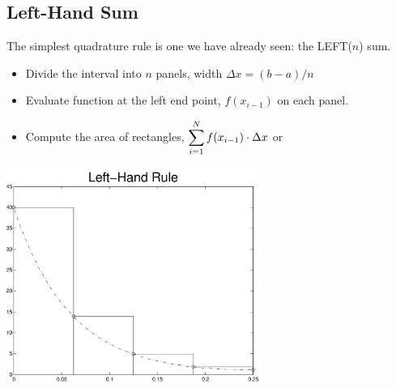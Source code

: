 \subsection*{Left-Hand Sum}
The simplest quadrature rule is one we have already seen: the LEFT($n$) sum.
\begin{itemize}
\item Divide the interval into $n$ panels, width $\Delta x = (b-a) / n$
\item Evaluate function at the left end point,
  $f(x_{i-1})$ on each panel. 
\item Compute the area of rectangles, $\displaystyle \sum_{i=1}^N f(x_{i-1}) \cdot \Delta x$ or
\end{itemize}
\begin{center}
\includegraphics[height=7cm]{graphics/notes_06_f_left_hand_rule}
\end{center}

\newpage

